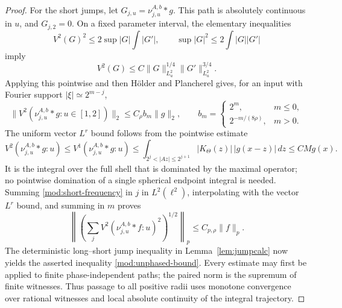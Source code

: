 \documentclass[11pt]{article}
\numberwithin{equation}{section}
\theoremstyle{remark}
\theoremstyle{definition}
\begin{document}
\begin{proof}
For the short jumps, let $G_{j,u}=\nu^{A,b}_{j,u}*g$. This path is
absolutely continuous in $u$, and $G_{j,2}=0$. On a fixed parameter
interval, the elementary inequalities
\[
 V^2(G)^2\le2\sup|G|\int|G'|,
 \qquad \sup|G|^2\le2\int|G||G'|
\]
imply
\begin{equation}\label{mod:sobolev-variation}
 V^2(G)\le C\|G\|_{L^2_u}^{1/4}\|G'\|_{L^2_u}^{3/4}.
\end{equation}
Applying this pointwise and then H\"older and Plancherel gives, for an
input with Fourier support $|\xi|\simeq2^{m-j}$,
\begin{equation}\label{mod:short-frequency}
 \|V^2(\nu^{A,b}_{j,u}*g:u\in[1,2])\|_2
 \le C_\rho b_m\|g\|_2,
 \qquad
 b_m=\begin{cases}2^m,&m\le0,\\2^{-m/(8\rho)},&m>0.\end{cases}
\end{equation}
The uniform vector $L^r$ bound follows from the pointwise estimate
\[
 V^2(\nu^{A,b}_{j,u}*g:u)\le V^1(\nu^{A,b}_{j,u}*g:u)
 \le\int_{2^j<|Az|\le2^{j+1}}|K_\Theta(z)|\,|g(x-z)|\,dz
 \le C M g(x).
\]
It is the integral over the full shell that is dominated by the maximal
operator; no pointwise domination of a single spherical endpoint
integral is needed. Summing \eqref{mod:short-frequency} in $j$ in
$L^2(\ell^2)$, interpolating with the vector $L^r$ bound, and summing in
$m$ proves
\[
 \left\|\left(\sum_jV^2(\nu^{A,b}_{j,u}*f:u)^2\right)^{1/2}\right\|_p
 \le C_{p,\rho}\|f\|_p.
\]
The deterministic long--short jump inequality in
Lemma~\ref{lem:jumpcalc} now yields the asserted inequality \eqref{mod:unphased-bound}.
Every estimate may first be applied to finite phase-independent paths;
the paired norm is the supremum of finite witnesses. Thus passage to
all positive radii uses monotone convergence over rational witnesses
and local absolute continuity of the integral trajectory.
\end{proof}
\end{document}
